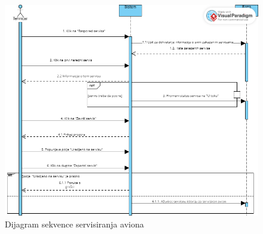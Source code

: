 \documentclass[a4paper]{article}
\begin{document}
\begin{figure}[H]
\begin{center}
\includegraphics[scale=0.6, width = 1.0\textwidth]{Dijagrami/Dijagrami_sekvence/Dijagram_sekvence_servisiranje_aviona.png}
\end{center}
\caption{Dijagram sekvence servisiranja aviona}
\label{fig:ds_servisiranje_aviona}
\end{figure}
\end{document}
